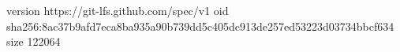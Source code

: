version https://git-lfs.github.com/spec/v1
oid sha256:8ac37b9afd7eca8ba935a90b739dd5c405dc913de257ed53223d03734bbcf634
size 122064
